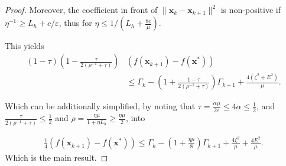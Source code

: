 \documentclass[10pt,a4paper]{amsart}
\def\eps{{\varepsilon}}
\def\vx{{\bm{x}}}
\begin{document}
\begin{proof}
Moreover, the coefficient in front of $\|\vx_k - \vx_{k+1}\|^2$ is non-positive if $\eta^{-1} \ge L_h + c/\eps$, thus for $\eta\le  1/(L_h + \frac{8c}{\mu})$.

This yields 
\begin{align*}
        \left(1 - \tau\right)\left(1 - \frac{\tau}{2(\rho^{-1} + \tau)}\right)&(f(\vx_{k+1}) - f(\vx^*)) \\
        &\le \Gamma_k - \left(1 +  \frac{1-\tau}{2(\rho^{-1} + \tau)}\right)\Gamma_{k+1} +  \frac{4(\zeta^2 +E^2)}{\mu}.
\end{align*}

Which can be additionally simplified, by noting that $\tau = \frac{\alpha \mu}{2\eps} \le 4 \alpha \le \frac{1}{2}$, and \(\frac{\tau}{2(\rho^{-1} + \tau)} \le \frac{1}{2}\) and $\rho = \frac{\eta \mu}{1+\eta L_h} \ge \frac{\eta\mu}{2}$, into

\begin{align*}
        \frac{1}{4}(f(\vx_{k+1}) - f(\vx^*)) 
        \le \Gamma_k - \left(1 +  \frac{\eta \mu}{8}\right)\Gamma_{k+1} + \frac{4\zeta^2}{\mu} + \frac{4E^2}{\mu}.
\end{align*}
Which is the main result.

\end{proof}
\end{document}
